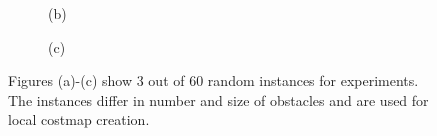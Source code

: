 \begin{figure}[thpb]
\begin{subfigure}[thpb]{0.23\textwidth}
        \caption{(b)}
        \label{fig_instances_2}
      \end{subfigure}     
      \begin{subfigure}[thpb]{0.23\textwidth}    
        \caption{(c)}
        \label{fig_instances_3}
      \end{subfigure} 
       
       \caption{Figures (a)-(c) show 3 out of 60 random instances for experiments. The instances differ in number and size of obstacles and are used for local costmap creation.}
      \label{fig:fig_instances}
   \end{figure}
   
